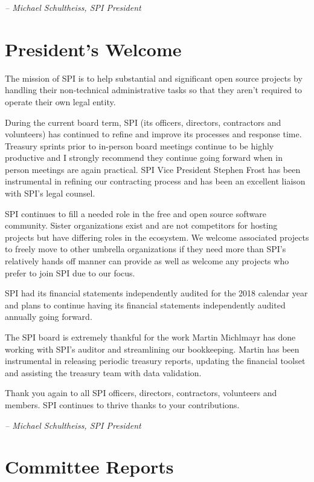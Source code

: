 \documentclass[a4paper]{report}
\begin{document}
  \emph{-- Michael Schultheiss, SPI President}

\newpage

\tableofcontents

\newpage

\chapter{President's Welcome}
\label{sec:president}

The mission of SPI is to help substantial and significant open source
projects by handling their non-technical administrative tasks so that
they aren't required to operate their own legal entity.

During the current board term, SPI (its officers, directors, contractors
and volunteers) has continued to refine and improve its processes and
response time.  Treasury sprints prior to in-person board meetings
continue to be highly productive and I strongly recommend they continue
going forward when in person meetings are again practical. SPI Vice
President Stephen Frost has been instrumental in refining our
contracting process and has been an excellent liaison with SPI's legal
counsel.

SPI continues to fill a needed role in the free and open source software
community. Sister organizations exist and are not competitors for
hosting projects but have differing roles in the ecosystem. We welcome
associated projects to freely move to other umbrella organizations if
they need more than SPI's relatively hands off manner can provide as
well as welcome any projects who prefer to join SPI due to our focus.

SPI had its financial statements independently audited for the 2018
calendar year and plans to continue having its financial statements
independently audited annually going forward.

The SPI board is extremely thankful for the work Martin Michlmayr has
done working with SPI's auditor and streamlining our bookkeeping. Martin
has been instrumental in releasing periodic treasury reports, updating
the financial toolset and assisting the treasury team with data
validation.

Thank you again to all SPI officers, directors, contractors, volunteers
and members. SPI continues to thrive thanks to your contributions.

  \emph{-- Michael Schultheiss, SPI President}

\chapter{Committee Reports}
\end{document}

